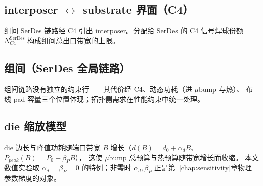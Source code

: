 \subsection{interposer $\leftrightarrow$ substrate 界面（C4）}\label{sec:bg-c4}

组间 SerDes 链路经 C4 引出 interposer。分配给 SerDes 的 C4 信号焊球份额
$N_{C4}^{\text{SerDes}}$ 构成组间总出口带宽的上限。

\subsection{组间（SerDes 全局链路）}\label{sec:bg-intergroup}

组间链路没有独立的约束行——其代价经 C4、动态功耗（进 $\mu$bump 与热）、
布线 pad 容量三个位置体现；拓扑侧需求在性能约束中统一处理。

\subsection{die 缩放模型}\label{sec:bg-diescale}

die 边长与峰值功耗随端口带宽 $B$ 增长（$d(B)=d_0+\alpha_d B$、$P_{peak}(B)=P_0+\beta_P B$），
这使 $\mu$bump 总预算与热预算随带宽增长而收缩。
本文数值实验取 $\alpha_d=\beta_P=0$ 的特例；非零时 $\alpha_d,\beta_P$ 正是第~\ref{chap:sensitivity}章物理参数梯度的对象。
